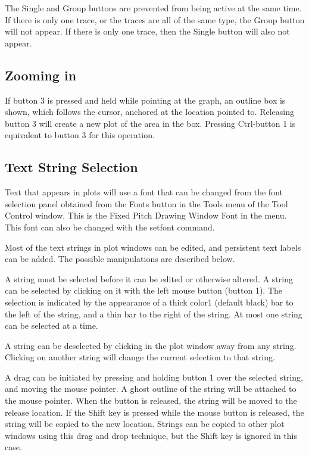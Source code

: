 \begin{description}
The {\cb Single} and {\cb Group} buttons are prevented from being
active at the same time.  If there is only one trace, or the traces
are all of the same type, the {\cb Group} button will not appear.  If
there is only one trace, then the {\cb Single} button will also not
appear.
\end{description}

\subsection{Zooming in}

If button 3 is pressed and held while pointing at the graph, an
outline box is shown, which follows the cursor, anchored at the
location pointed to.  Releasing button 3 will create a new plot of the
area in the box.  Pressing {\kb Ctrl}-button 1 is equivalent to button
3 for this operation.

\subsection{Text String Selection}

Text that appears in plots will use a font that can be changed from
the font selection panel obtained from the {\cb Fonts} button in the
{\cb Tools} menu of the {\cb Tool Control} window.  This is the {\cb
Fixed Pitch Drawing Window Font} in the menu.  This font can also be
changed with the {\cb setfont} command.

Most of the text strings in plot windows can be edited, and persistent
text labels can be added.  The possible manipulations are described
below.

A string must be selected before it can be edited or otherwise
altered.  A string can be selected by clicking on it with the left
mouse button (button 1).  The selection is indicated by the appearance
of a thick color1 (default black) bar to the left of the string, and a
thin bar to the right of the string.  At most one string can be
selected at a time.

A string can be deselected by clicking in the plot window away from
any string.  Clicking on another string will change the current
selection to that string.

A drag can be initiated by pressing and holding button 1 over the
selected string, and moving the mouse pointer.  A ghost outline of the
string will be attached to the mouse pointer.  When the button is
released, the string will be moved to the release location.  If the
{\kb Shift} key is pressed while the mouse button is released, the
string will be copied to the new location.  Strings can be copied to
other plot windows using this drag and drop technique, but the {\kb
Shift} key is ignored in this case.

